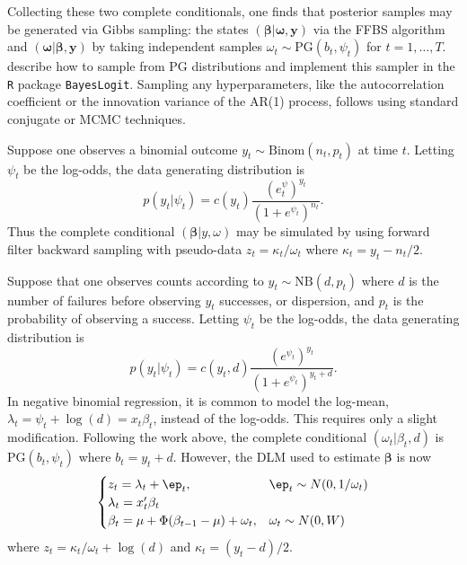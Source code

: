 \documentclass[12pt]{article}
\newcommand{\PG}{\text{PG}}
\newcommand{\NB}{\text{NB}}
\newcommand{\bbeta}{\boldsymbol{\beta}}
\newcommand{\oomega}{\boldsymbol{\omega}}
\newcommand{\yy}{\boldsymbol{y}}
\begin{document}
Collecting these two complete conditionals, one finds that posterior samples may
be generated via Gibbs sampling: the states $(\bbeta|\oomega, \yy)$ via the FFBS
algorithm and $(\oomega | \bbeta, \yy)$ by taking independent samples $\omega_t
\sim \PG(b_t, \psi_t)$ for $t=1, \ldots, T$.  \cite{polson-etal-2013} describe
how to sample from $\PG$ distributions and implement this sampler in the
\texttt{R} package \texttt{BayesLogit}.  Sampling any hyperparameters, like the
autocorrelation coefficient or the innovation variance of the AR(1) process,
follows using standard conjugate or MCMC techniques.

\begin{example}
  Suppose one observes a binomial outcome $y_t \sim \text{Binom}(n_t, p_t)$ at
  time $t$.  Letting $\psi_t$ be the log-odds, the data generating distribution
  is
\[
p(y_t | \psi_t) = c(y_t) \frac{(e^\psi_t)^{y_t}}{(1+e^{\psi_t})^{n_t}}.
\]
Thus the complete conditional $(\bbeta | y, \omega)$ may be simulated by using
forward filter backward sampling with pseudo-data $z_t = \kappa_t / \omega_t$
where $\kappa_t = y_t - n_t / 2$.
\end{example}


\begin{example}
  Suppose that one observes counts according to $y_t \sim \NB(d, p_t)$ where $d$
  is the number of failures before observing $y_t$ successes, or dispersion,
  and $p_t$ is the probability of observing a success.  Letting $\psi_t$ be the
  log-odds, the data generating distribution is
\[
p(y_t | \psi_t) = c(y_t, d) \frac{(e^{\psi_t})^{y_t}}{(1+e^{\psi_t})^{y_t+d}}.
\]
In negative binomial regression, it is common to model the log-mean, $\lambda_t
= \psi_t + \log(d) = x_t \beta_t$, instead of the log-odds.  This requires only
a slight modification.  Following the work above, the complete conditional
$(\omega_t | \beta_t, d)$ is $\PG(b_t, \psi_t)$ where $b_t = y_t + d$.  However,
the DLM used to estimate $\bbeta$ is now
\[
\begin{cases}
z_t = \lambda_t + \ep_t, & \ep_t \sim N(0, 1/\omega_t) \\
\lambda_t = x_t' \beta_t \\
\beta_t = \mu + \Phi (\beta_{t-1} - \mu) + \omega_t, & \omega_t \sim N(0, W)
\end{cases}
\]
where $z_t = \kappa_t / \omega_t + \log(d)$ and $\kappa_t = (y_t - d) / 2$.
\end{example}
\end{document}
